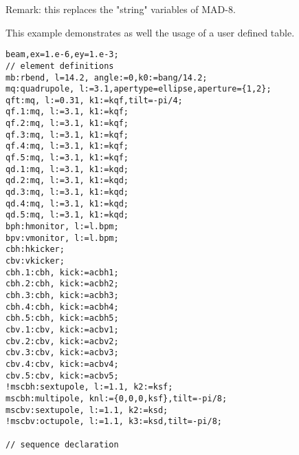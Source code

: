 Remark: this replaces the "string" variables of MAD-8. 

\href{ucreate}{} This example demonstrates as well the usage of a user defined table. 
\begin{verbatim}
beam,ex=1.e-6,ey=1.e-3;
// element definitions
mb:rbend, l=14.2, angle:=0,k0:=bang/14.2;
mq:quadrupole, l:=3.1,apertype=ellipse,aperture={1,2};
qft:mq, l:=0.31, k1:=kqf,tilt=-pi/4;
qf.1:mq, l:=3.1, k1:=kqf;
qf.2:mq, l:=3.1, k1:=kqf;
qf.3:mq, l:=3.1, k1:=kqf;
qf.4:mq, l:=3.1, k1:=kqf;
qf.5:mq, l:=3.1, k1:=kqf;
qd.1:mq, l:=3.1, k1:=kqd;
qd.2:mq, l:=3.1, k1:=kqd;
qd.3:mq, l:=3.1, k1:=kqd;
qd.4:mq, l:=3.1, k1:=kqd;
qd.5:mq, l:=3.1, k1:=kqd;
bph:hmonitor, l:=l.bpm;
bpv:vmonitor, l:=l.bpm;
cbh:hkicker;
cbv:vkicker;
cbh.1:cbh, kick:=acbh1;
cbh.2:cbh, kick:=acbh2;
cbh.3:cbh, kick:=acbh3;
cbh.4:cbh, kick:=acbh4;
cbh.5:cbh, kick:=acbh5;
cbv.1:cbv, kick:=acbv1;
cbv.2:cbv, kick:=acbv2;
cbv.3:cbv, kick:=acbv3;
cbv.4:cbv, kick:=acbv4;
cbv.5:cbv, kick:=acbv5;
!mscbh:sextupole, l:=1.1, k2:=ksf;
mscbh:multipole, knl:={0,0,0,ksf},tilt=-pi/8;
mscbv:sextupole, l:=1.1, k2:=ksd;
!mscbv:octupole, l:=1.1, k3:=ksd,tilt=-pi/8;

// sequence declaration


\end{verbatim}

